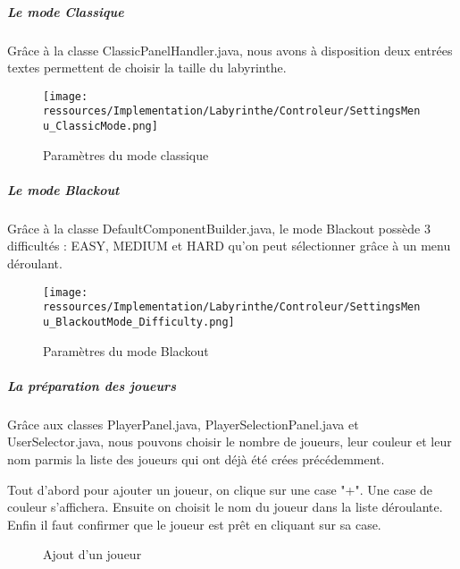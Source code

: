 \subparagraph*{Le mode Classique}

Grâce à la classe ClassicPanelHandler.java, nous avons à disposition deux entrées textes permettent de choisir la taille du labyrinthe.

\begin{figure}
    \centering
    \texttt{[image: ressources/Implementation/Labyrinthe/Controleur/SettingsMenu\_ClassicMode.png]}
    \caption{Paramètres du mode classique}
    \label{fig:ClassicMode}
\end{figure}

\subparagraph*{Le mode Blackout}

Grâce à la classe DefaultComponentBuilder.java, le mode Blackout possède 3 difficultés : EASY, MEDIUM et HARD qu'on peut sélectionner grâce à un menu déroulant.

\begin{figure}
    \centering
    \texttt{[image: ressources/Implementation/Labyrinthe/Controleur/SettingsMenu\_BlackoutMode\_Difficulty.png]}
    \caption{Paramètres du mode Blackout}
    \label{fig:BlackoutModeDifficulty}
\end{figure}

\subparagraph*{La préparation des joueurs}

Grâce aux classes PlayerPanel.java, PlayerSelectionPanel.java et UserSelector.java, nous pouvons choisir le nombre de joueurs, leur couleur et leur nom parmis la liste des joueurs qui ont déjà été crées précédemment.

Tout d'abord pour ajouter un joueur, on clique sur une case "+". Une case de couleur s'affichera. Ensuite on choisit le nom du joueur dans la liste déroulante. Enfin il faut confirmer que le joueur est prêt en cliquant sur sa case.

\begin{figure}
    \centering
    \qquad
    \qquad
    \caption{Ajout d'un joueur}
    \label{fig:AddPlayer}
\end{figure}